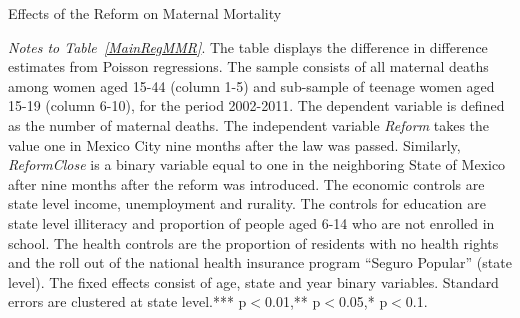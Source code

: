\documentclass[a4paper, 11pt]{article}
\begin{document}
\begin{spacing}{2}
\begin{table}\caption{Effects of the Reform on Maternal Mortality} \label{MainRegMMR}
\begin{threeparttable}
{\footnotesize}
\begin{tablenotes}
\footnotesize
\item \textit{Notes to Table~\ref{MainRegMMR}}. The table displays the difference in difference estimates from Poisson regressions. The sample consists of all maternal deaths among women aged 15-44 (column 1-5) and sub-sample of teenage women aged 15-19 (column 6-10), for the period 2002-2011. The dependent variable is defined as the number of maternal deaths. The independent variable \textit{Reform} takes the value one in Mexico City nine months after the law was passed. Similarly, \textit{ReformClose} is a binary variable equal to one in the neighboring State of Mexico after nine months after the reform was introduced. The economic controls are state level income, unemployment and rurality. The controls for education are state level illiteracy and proportion of people aged 6-14 who are not enrolled in school. The health controls are the proportion of residents with no health rights and the roll out of the national health insurance program ``Seguro Popular'' (state level). The fixed effects consist of age, state and year binary variables. Standard errors are clustered at state level.*** p$<$0.01,** p$<$0.05,* p$<$0.1.
\end{tablenotes} 
\end{threeparttable}
\end{table}


\end{spacing}
\end{document}
